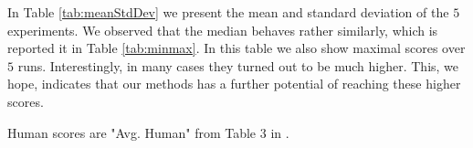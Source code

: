 In Table \ref{tab:meanStdDev} we present the mean and standard deviation of the $5$ experiments. We observed that the median behaves rather similarly, which is reported it in Table \ref{tab:minmax}. In this table we also show maximal scores over $5$ runs. Interestingly, in many cases they turned out to be much higher. This, we hope, indicates that our methods has a further potential of reaching these higher scores. 

Human scores are "Avg. Human" from Table 3 in \cite{Pohlenetal2018}.

\newenvironment{changemargin}[2]{%
\begin{list}{}{%
\setlength{\topsep}{0pt}%
\setlength{\leftmargin}{#1}%
\setlength{\rightmargin}{#2}%
\setlength{\listparindent}{\parindent}%
\setlength{\itemindent}{\parindent}%
\setlength{\parsep}{\parskip}%
}%
\item[]}{\end{list}}

